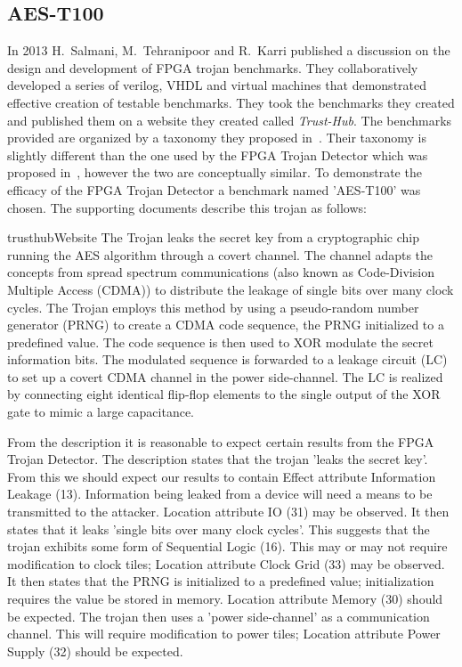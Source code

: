 \documentclass[journal, hidelinks]{IEEEtran}
\begin{document}
\subsection{AES-T100} \label{sec:aesT100}
In 2013 H.~Salmani, M.~Tehranipoor and R.~Karri published a discussion on the design and development of FPGA trojan benchmarks.
They collaboratively developed a series of verilog, VHDL and virtual machines that demonstrated effective creation of testable benchmarks.
They took the benchmarks they created and published them on a website they created called \textit{Trust-Hub}.
The benchmarks provided are organized by a taxonomy they proposed in~\cite{trustHubPaper}.
Their taxonomy is slightly different than the one used by the FPGA Trojan Detector which was proposed in~\cite{samerAttribute}, however the two are conceptually similar.
To demonstrate the efficacy of the FPGA Trojan Detector a benchmark named 'AES-T100' was chosen. 
The supporting documents describe this trojan as follows:
\begin{displaycquote}{trusthubWebsite}
	The Trojan leaks the secret key from a cryptographic chip running the AES algorithm through a covert channel. The channel adapts the concepts from spread spectrum communications (also known as Code-Division Multiple Access (CDMA)) to distribute the leakage of single bits over many clock cycles. The Trojan employs this method by using a pseudo-random number generator (PRNG) to create a CDMA code sequence, the PRNG initialized to a predefined value. The code sequence is then used to XOR modulate the secret information bits. The modulated sequence is forwarded to a leakage circuit (LC) to set up a covert CDMA channel in the power side-channel. The LC is realized by connecting eight identical flip-flop elements to the single output of the XOR gate to mimic a large capacitance.
\end{displaycquote}

From the description it is reasonable to expect certain results from the FPGA Trojan Detector.
The description states that the trojan 'leaks the secret key'.
From this we should expect our results to contain Effect attribute Information Leakage (13).
Information being leaked from a device will need a means to be transmitted to the attacker.
Location attribute IO (31) may be observed.
It then states that it leaks 'single bits over many clock cycles'. 
This suggests that the trojan exhibits some form of Sequential Logic (16).
This may or may not require modification to clock tiles; Location attribute Clock Grid (33) may be observed. 
It then states that the PRNG is initialized to a predefined value; initialization requires the value be stored in memory. 
Location attribute Memory (30) should be expected.
The trojan then uses a 'power side-channel' as a communication channel.
This will require modification to power tiles; Location attribute Power Supply (32) should be expected.
\end{document}
